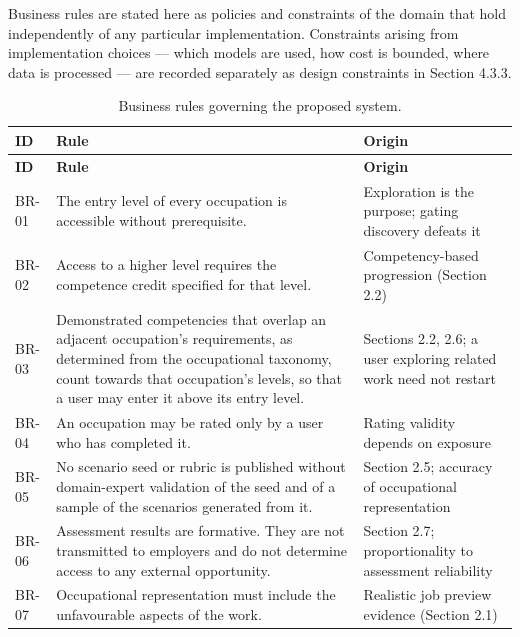 Business rules are stated here as policies and constraints of the domain that hold independently of any particular implementation. Constraints arising from implementation choices --- which models are used, how cost is bounded, where data is processed --- are recorded separately as design constraints in Section 4.3.3.

{\small{}\renewcommand{\arraystretch}{1.1}
\begin{longtable}{|>{\raggedright\arraybackslash}p{}|>{\raggedright\arraybackslash}p{}|>{\raggedright\arraybackslash}p{}|}
\caption{Business rules governing the proposed system.} \\
\hline
\textbf{ID} & \textbf{Rule} & \textbf{Origin} \\ \hline
\endfirsthead
\hline
\textbf{ID} & \textbf{Rule} & \textbf{Origin} \\ \hline
\endhead
BR-01 & The entry level of every occupation is accessible without prerequisite. & Exploration is the purpose; gating discovery defeats it \\ \hline
BR-02 & Access to a higher level requires the competence credit specified for that level. & Competency-\allowbreak{}based progression (Section 2.2) \\ \hline
BR-03 & Demonstrated competencies that overlap an adjacent occupation's requirements, as determined from the occupational taxonomy, count towards that occupation's levels, so that a user may enter it above its entry level. & Sections 2.2, 2.6; a user exploring related work need not restart \\ \hline
BR-04 & An occupation may be rated only by a user who has completed it. & Rating validity depends on exposure \\ \hline
BR-05 & No scenario seed or rubric is published without domain-\allowbreak{}expert validation of the seed and of a sample of the scenarios generated from it. & Section 2.5; accuracy of occupational representation \\ \hline
BR-06 & Assessment results are formative. They are not transmitted to employers and do not determine access to any external opportunity. & Section 2.7; proportionality to assessment reliability \\ \hline
BR-07 & Occupational representation must include the unfavourable aspects of the work. & Realistic job preview evidence (Section 2.1) \\ \hline

\end{longtable}}
